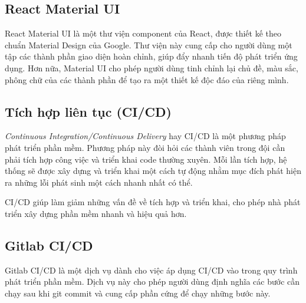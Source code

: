 \documentclass[./../main.tex]{subfiles}
\begin{document}
\hypertarget{react-material-ui}{%
\subsection{React Material UI}\label{react-material-ui}}

React Material UI là một thư viện component của React, được thiết kế
theo chuẩn Material Design của Google. Thư viện này cung cấp cho người
dùng một tập các thành phần giao diện hoàn chỉnh, giúp đẩy nhanh tiến độ
phát triển ứng dụng. Hơn nữa, Material UI cho phép người dùng tinh chỉnh
lại chủ đề, màu sắc, phông chữ của các thành phần để tạo ra một thiết kế
độc đáo của riêng mình.

\hypertarget{tuxedch-hux1ee3p-liuxean-tux1ee5c-cicd}{%
\subsection{Tích hợp liên tục
(CI/CD)}\label{tuxedch-hux1ee3p-liuxean-tux1ee5c-cicd}}

\emph{Continuous Integration/Continuous Delivery} hay CI/CD là một
phương pháp phát triển phần mềm. Phương pháp này đòi hỏi các thành viên
trong đội cần phải tích hợp công việc và triển khai code thường xuyên.
Mỗi lần tích hợp, hệ thống sẽ được xây dựng và triển khai một cách tự
động nhằm mục đích phát hiện ra những lỗi phát sinh một cách nhanh nhất
có thể.

CI/CD giúp làm giảm những vấn đề về tích hợp và triển khai, cho phép nhà
phát triển xây dựng phần mềm nhanh và hiệu quả hơn.

\hypertarget{gitlab-cicd}{%
\subsection{Gitlab CI/CD}\label{gitlab-cicd}}

Gitlab CI/CD là một dịch vụ dành cho việc áp dụng CI/CD vào trong quy
trình phát triển phần mềm. Dịch vụ này cho phép người dùng định nghĩa
các bước cần chạy sau khi git commit và cung cấp phần cứng để chạy những
bước này.
\end{document}
